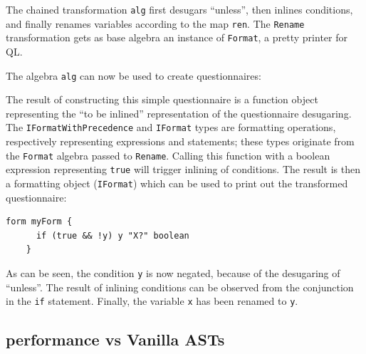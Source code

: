 
The chained transformation \lstinline{alg} first desugars ``unless'', then inlines conditions, and finally renames variables according to the map \lstinline{ren}.
The \lstinline{Rename} transformation gets as base algebra an instance of \lstinline{Format}, a pretty printer for QL. 

The algebra \lstinline{alg} can now be used to create questionnaires:


The result of constructing this simple questionnaire is a function object representing the ``to be inlined'' representation of the questionnaire desugaring.
The \lstinline{IFormatWithPrecedence} and \lstinline{IFormat} types are  formatting operations, respectively representing expressions and statements; these types originate from the \lstinline{Format} algebra passed to \lstinline{Rename}.
Calling this function with a boolean expression representing \lstinline{true} will trigger inlining of conditions. The result is then a formatting object (\lstinline{IFormat}) which can be used to print out the transformed questionnaire:

  \begin{lstlisting}[language=ql]
    form myForm {
      if (true && !y) y "X?" boolean
    }
  \end{lstlisting}

As can be seen, the condition \lstinline{y} is now negated, because of the desugaring of ``unless''.
The result of inlining conditions can be observed from the conjunction in the \lstinline[language=ql]{if} statement. Finally, the variable \lstinline{x} has been renamed to \lstinline{y}.
  
\subsection{\name performance vs Vanilla ASTs}

